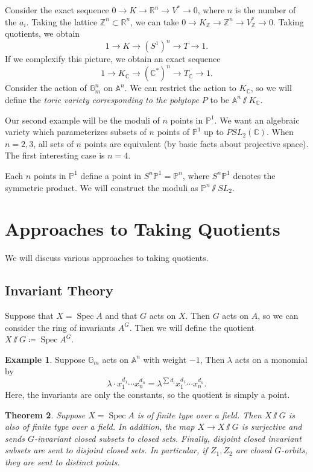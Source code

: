 \documentclass[leqno, openany]{memoir}
\newtheorem{thm}{Theorem}[section]
\theoremstyle{definition}
\newtheorem{exm}[thm]{Example}
\theoremstyle{remark}
\theoremstyle{plain}
\theoremstyle{definition}
\theoremstyle{remark}
\newcommand{\A}{\mathbb{A}}
\newcommand{\R}{\mathbb{R}}
\newcommand{\C}{\mathbb{C}}
\newcommand{\Z}{\mathbb{Z}}
\renewcommand{\P}{\mathbb{P}}
\DeclareMathOperator{\Spec}{Spec}
\begin{document}
Consider the exact sequence $0 \to K \to \R^n \to V^* \to 0$, where $n$ is the
number of the $a_i$. Taking the lattice $\Z^n \subset \R^n$, we can take $0 \to
K_{\Z} \to \Z^n \to V_{\Z}^* \to 0$. Taking quotients, we obtain \[ 1 \to K \to
(S^1)^n \to T \to 1. \] If we complexify this picture, we obtain an exact
sequence \[ 1 \to K_{\C} \to (\C^*)^n \to T_{\C} \to 1. \] Consider the action
of $\mathbb{G}_m^n$ on $\A^n$. We can restrict the action to $K_{\C}$, so we
will define the \textit{toric variety corresponding to the polytope $P$} to be
$\A^n \sslash K_{\C}$. 

Our second example will be the moduli of $n$ points in $\P^1$. We want an
algebraic variety which parameterizes subsets of $n$ points of $\P^1$ up to
$PSL_2(\C)$. When $n = 2,3$, all sets of $n$ points are equivalent (by basic
facts about projective space). The first interesting case is $n=4$.

Each $n$ points in $\P^1$ define a point in $S^n \P^1 = \P^n$, where $S^n \P^1$
denotes the symmetric product. We will construct the moduli as $\P^n \sslash
SL_2$.

\section{Approaches to Taking Quotients}%
\label{sec:approaches_to_taking_quotients}

We will discuss various approaches to taking quotients.

\subsection{Invariant Theory}%

Suppose that $X = \Spec A$ and that $G$ acts on $X$. Then $G$ acts on $A$, so
we can consider the ring of invariants $A^G$. Then we will define the quotient
$X \sslash G \coloneqq \Spec A^G$. 

\begin{exm} Suppose $\mathbb{G}_m$ acts on $\A^n$ with weight $-1$, Then
    $\lambda$ acts on a monomial by \[ \lambda \cdot x_1^{d_1} \cdots x_n^{d_n}
    = \lambda^{\sum d_i} x_1^{d_1} \cdots x_n^{d_n}. \] Here, the invariants
    are only the constants, so the quotient is simply a point.  \end{exm}

\begin{thm} Suppose $X = \Spec A$ is of finite type over a field. Then $X
    \sslash G$ is also of finite type over a field. In addition, the map $X \to
    X \sslash G$ is surjective and sends $G$-invariant closed subsets to closed
    sets. Finally, disjoint closed invariant subsets are sent to disjoint
    closed sets. In particular, if $Z_1,Z_2$ are closed $G$-orbits, they are
    sent to distinct points.  \end{thm}
\end{document}
